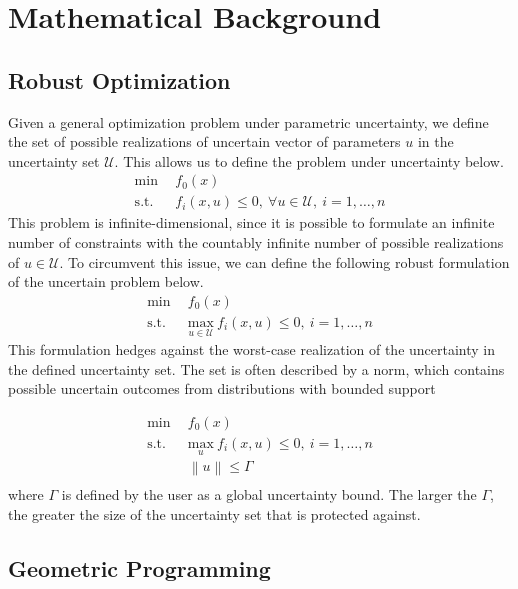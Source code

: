 \section{Mathematical Background}

\subsection{Robust Optimization}

Given a general optimization problem under parametric uncertainty, we define the set of possible
realizations of uncertain vector of parameters $u$ in the uncertainty set $\mathcal{U}$. This
allows us to define the problem under uncertainty below.
\begin{align*}
    \text{min} &~~f_0(x) \\
    \text{s.t.}     &~~f_i(x,u) \leq 0,~\forall u \in \mathcal{U},~i = 1,\ldots,n
\end{align*}
This problem is infinite-dimensional, since it is possible to formulate an infinite number of constraints
with the countably infinite number of possible realizations of $u \in \mathcal{U}$. To circumvent this issue,
we can define the following robust formulation of the uncertain problem below.
\begin{align*}
    \text{min} &~~f_0(x) \\
    \text{s.t.}     &~~\underset{u \in \mathcal{U}}{\text{max}}~f_i(x,u) \leq 0,~i = 1,\ldots,n
\end{align*}
This formulation hedges against the worst-case realization of the uncertainty in the defined uncertainty
set. The set is often described by a norm, which contains possible uncertain outcomes from distributions with
bounded support

\begin{equation}
    \begin{split}
        \text{min} &~~f_0(x) \\
    \text{s.t.}     &~~\underset{u}{\text{max}}~f_i(x,u) \leq 0,~i = 1,\ldots,n \\
                    &~~\left\lVert u \right\rVert \leq \Gamma \\
        \end{split}
    \label{eq:normform}
\end{equation}
where $\Gamma$ is defined by the user as a global uncertainty bound. The larger the $\Gamma$,
the greater the size of the uncertainty set that is protected against.

\subsection{Geometric Programming}

